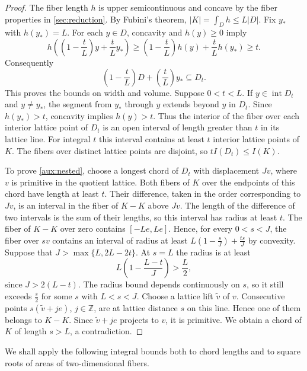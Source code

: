 \documentclass[reqno, 11pt]{article}
\numberwithin{equation}{section}
\theoremstyle{definition}
\newcommand{\Z}{\mathbb Z}
\DeclareMathOperator{\intr}{int}
\begin{document}
\begin{proof}
The fiber length $h$ is upper semicontinuous and concave by the
fiber properties in \cref{sec:reduction}. By Fubini's
theorem, $|K|=\int_D h\le L|D|$. Fix $y_*$ with $h(y_*)=L$.
For each $y\in D$, concavity and $h(y)\ge0$ imply
\[
 h\left(\left(1-\frac{t}{L}\right)y+\frac{t}{L}y_*\right)
 \ge\left(1-\frac{t}{L}\right)h(y)+\frac{t}{L}h(y_*)\ge t .
\]
Consequently
\[
              (1-\frac{t}{L})D+(\frac{t}{L})y_*\subseteq D_t.
\]
This proves the bounds on width and volume. Suppose $0<t<L$.
If $y\in\intr D_t$ and $y\ne y_*$, the segment from $y_*$ through
$y$ extends beyond $y$ in $D_t$. Since $h(y_*)>t$, concavity implies
$h(y)>t$. Thus the interior of the fiber over each interior lattice
point of $D_t$ is an open interval of length greater than $t$ in its
lattice line. For integral $t$ this interval contains at least $t$
interior lattice points of $K$. The fibers over distinct lattice points are disjoint, so
$tI(D_t)\le I(K)$.

To prove \eqref{aux:nested}, choose a longest chord of $D_t$ with
displacement $Jv$, where $v$ is primitive in the quotient lattice.
Both fibers of $K$ over the endpoints of this chord have length at
least $t$. Their difference, taken in the order corresponding to $Jv$,
is an interval in the fiber of $K-K$ above $Jv$. The length of the
difference of two intervals is the sum of their lengths, so this
interval has radius at least $t$.
The fiber of $K-K$ over zero contains $[-Le,Le]$. Hence, for every
$0<s<J$, the fiber over $sv$ contains an interval of radius at least
$L(1-\frac{s}{J})+\frac{ts}{J}$ by convexity. Suppose that
$J>\max\{L,2L-2t\}$. At $s=L$ the radius is at least
\[
 L\left(1-\frac{L-t}{J}\right)>\frac{L}{2},
\]
since $J>2(L-t)$. The radius bound depends continuously on $s$,
so it still exceeds $\frac{s}{2}$ for some $s$ with $L<s<J$. Choose a lattice lift
$\widetilde v$ of $v$. Consecutive points $s(\widetilde v+je)$,
$j\in\Z$, are at lattice distance $s$ on this line. Hence one of them
belongs to $K-K$. Since $\widetilde v+je$ projects to $v$, it is
primitive. We obtain a chord of $K$ of length $s>L$, a contradiction.
\end{proof}

We shall apply the following integral bounds both to chord lengths
and to square roots of areas of two-dimensional fibers.
\end{document}
